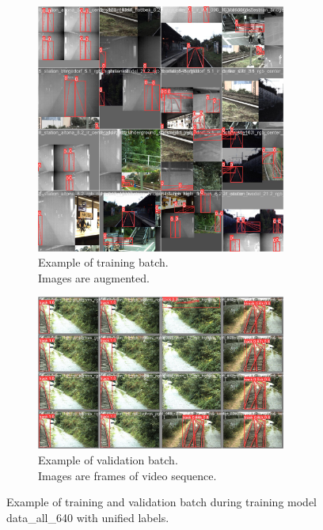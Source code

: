 \documentclass[Master,MDS,english]{BASE/twbook} %
\begin{document}
\begin{figure}
\centering
\begin{subfigure}[t]{.5\textwidth}
  \centering
  \includegraphics[width=0.9\textwidth]{images/yolo/all/train_batch0}
  \caption{Example of training batch.\\ Images are augmented.}
    \label{fig:mosaic_augmentation_all}
\end{subfigure}%
\begin{subfigure}[t]{.5\textwidth}
  \centering
  \includegraphics[width=0.9\textwidth]{images/yolo/all/val_batch2_pred}
  \caption{Example of validation batch.\\ Images are frames of video sequence.}
  \label{fig:validation_batch_1}
\end{subfigure}
\caption{Example of training and validation batch during training model data\_all\_640 with unified labels.}
\label{fig:yolo_all_example}
\end{figure}
\end{document}

